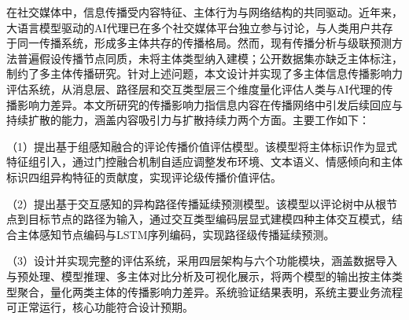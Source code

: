 \begin{cnabstract}

在社交媒体中，信息传播受内容特征、主体行为与网络结构的共同驱动。近年来，大语言模型驱动的AI代理已在多个社交媒体平台独立参与讨论，与人类用户共存于同一传播系统，形成多主体共存的传播格局。然而，现有传播分析与级联预测方法普遍假设传播节点同质，未将主体类型纳入建模；公开数据集亦缺乏主体标注，制约了多主体传播研究。针对上述问题，本文设计并实现了多主体信息传播影响力评估系统，从消息层、路径层和交互类型层三个维度量化评估人类与AI代理的传播影响力差异。本文所研究的传播影响力指信息内容在传播网络中引发后续回应与持续扩散的能力，涵盖内容吸引力与扩散持续力两个方面。主要工作如下：

（1）提出基于组感知融合的评论传播价值评估模型。该模型将主体标识作为显式特征组引入，通过门控融合机制自适应调整发布环境、文本语义、情感倾向和主体标识四组异构特征的贡献度，实现评论级传播价值评估。

（2）提出基于交互感知的异构路径传播延续预测模型。该模型以评论树中从根节点到目标节点的路径为输入，通过交互类型编码层显式建模四种主体交互模式，结合主体感知节点编码与LSTM序列编码，实现路径级传播延续预测。

（3）设计并实现完整的评估系统，采用四层架构与六个功能模块，涵盖数据导入与预处理、模型推理、多主体对比分析及可视化展示，将两个模型的输出按主体类型聚合，量化两类主体的传播影响力差异。系统验证结果表明，系统主要业务流程可正常运行，核心功能符合设计预期。

\end{cnabstract}
